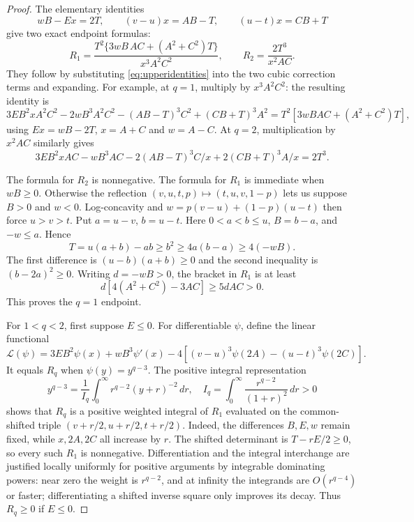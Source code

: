 \documentclass[11pt,a4paper]{amsart}
\numberwithin{equation}{section}
\theoremstyle{remark}
\begin{document}
\begin{proof}
The elementary identities
\begin{equation}
wB-Ex=2T,\qquad (v-u)x=AB-T,\qquad(u-t)x=CB+T
\label{eq:upperidentities}
\end{equation}
give two exact endpoint formulas:
\begin{equation}
R_1=\frac{T^2\{3wB\,AC+(A^2+C^2)T\}}{x^3A^2C^2},
\qquad R_2=\frac{2T^3}{x^2AC}.
\label{eq:upperendpoints}
\end{equation}
They follow by substituting \eqref{eq:upperidentities} into the two
cubic correction terms and expanding. For example, at $q=1$,
multiply by $x^3A^2C^2$: the resulting identity is
\[
3EB^2xA^2C^2-2wB^3A^2C^2
 -(AB-T)^3C^2+(CB+T)^3A^2
=T^2[3wBAC+(A^2+C^2)T],
\]
using $Ex=wB-2T$, $x=A+C$ and $w=A-C$. At $q=2$,
multiplication by $x^2AC$ similarly gives
\[
3EB^2xAC-wB^3AC
 -2(AB-T)^3C/x+2(CB+T)^3A/x=2T^3.
\]


The formula for $R_2$ is nonnegative. The formula for $R_1$ is immediate
when $wB\ge0$. Otherwise the reflection
$(v,u,t,p)\mapsto(t,u,v,1-p)$ lets us suppose $B>0$ and $w<0$.
Log-concavity and
$w=p(v-u)+(1-p)(u-t)$ then force $u>v>t$. Put $a=u-v$, $b=u-t$.
Here $0<a<b\le u$, $B=b-a$, and $-w\le a$. Hence
\[
T=u(a+b)-ab\ge b^2\ge4a(b-a)\ge4(-wB).
\]
The first difference is $(u-b)(a+b)\ge0$ and the second inequality is
$(b-2a)^2\ge0$. Writing $d=-wB>0$, the bracket in $R_1$ is at least
\[
d[4(A^2+C^2)-3AC]\ge5dAC>0.
\]
This proves the $q=1$ endpoint.

For $1<q<2$, first suppose $E\le0$. For differentiable $\psi$, define
the linear functional
\begin{equation}
\mathcal L(\psi)=3EB^2\psi(x)+wB^3\psi'(x)
-4[(v-u)^3\psi(2A)-(u-t)^3\psi(2C)].
\label{eq:Lfunctional}
\end{equation}
It equals $R_q$ when $\psi(y)=y^{q-3}$. The positive integral
representation
\begin{equation}
y^{q-3}=\frac1{I_q}\int_0^\infty
 r^{q-2}(y+r)^{-2}\,dr,
\quad I_q=\int_0^\infty\frac{r^{q-2}}{(1+r)^2}\,dr>0
\label{eq:shiftrep}
\end{equation}
shows that $R_q$ is a positive weighted integral of $R_1$ evaluated
on the common-shifted triple $(v+r/2,u+r/2,t+r/2)$. Indeed, the
differences $B,E,w$ remain fixed, while $x,2A,2C$ all increase by $r$.
The shifted determinant is $T-rE/2\ge0$, so every such $R_1$ is
nonnegative. Differentiation and the integral interchange are
justified locally uniformly for positive arguments by integrable
dominating powers: near zero the weight is $r^{q-2}$, and at infinity
the integrands are $O(r^{q-4})$ or faster; differentiating a shifted
inverse square only improves its decay.
Thus $R_q\ge0$ if $E\le0$.


\end{proof}
\end{document}
